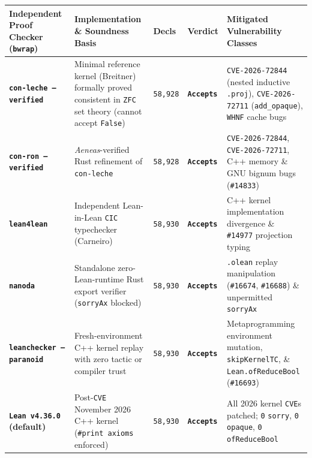 \documentclass[10pt,letterpaper]{article}
\newcounter{none}
\begin{document}
{\def\LTcaptype{none} %
{\footnotesize\setlength{\tabcolsep}{3.8pt}\renewcommand{\arraystretch}{1.15}
\begin{longtable}[]{@{}
  >{\raggedright\arraybackslash}p{}
  >{\raggedright\arraybackslash}p{}
  >{\centering\arraybackslash}p{}
  >{\centering\arraybackslash}p{}
  >{\raggedright\arraybackslash}p{}@{}}
\toprule\noalign{}
\textbf{Independent Proof Checker (\texttt{bwrap})} &
\textbf{Implementation \& Soundness Basis} &
\textbf{Decls} &
\textbf{Verdict} &
\textbf{Mitigated Vulnerability Classes} \\
\midrule\noalign{}
\endhead
\bottomrule\noalign{}
\endlastfoot
\textbf{\texttt{con-leche\ --verified}} & Minimal reference kernel
(Breitner) formally proved consistent in \texttt{ZFC} set theory (cannot
accept \texttt{False}) & \texttt{58,928} & \textbf{\texttt{Accepts}} &
\texttt{CVE-2026-72844} (nested inductive \texttt{.proj}),
\texttt{CVE-2026-72711} (\texttt{add\_opaque}), \texttt{WHNF} cache bugs \\
\textbf{\texttt{con-ron\ --verified}} & \emph{Aeneas}-verified Rust
refinement of \texttt{con-leche} & \texttt{58,928} &
\textbf{\texttt{Accepts}} & \texttt{CVE-2026-72844},
\texttt{CVE-2026-72711}, C++ memory \& GNU bignum bugs
(\texttt{\#14833}) \\
\textbf{\texttt{lean4lean}} & Independent Lean-in-Lean \texttt{CIC}
typechecker (Carneiro) & \texttt{58,930} & \textbf{\texttt{Accepts}} &
C++ kernel implementation divergence \& \texttt{\#14977} projection typing \\
\textbf{\texttt{nanoda}} & Standalone zero-Lean-runtime Rust export
verifier (\texttt{sorryAx} blocked) & \texttt{58,930} &
\textbf{\texttt{Accepts}} & \texttt{.olean} replay manipulation
(\texttt{\#16674}, \texttt{\#16688}) \& unpermitted \texttt{sorryAx} \\
\textbf{\texttt{leanchecker\ --paranoid}} & Fresh-environment C++ kernel
replay with zero tactic or compiler trust & \texttt{58,930} &
\textbf{\texttt{Accepts}} & Metaprogramming environment mutation,
\texttt{skipKernelTC}, \& \texttt{Lean.\allowbreak{}ofReduceBool} (\texttt{\#16693}) \\
\textbf{\texttt{Lean\ v4.36.0} (default)} & Post-\texttt{CVE} November
2026 C++ kernel (\texttt{\#print\ axioms} enforced) & \texttt{58,930} &
\textbf{\texttt{Accepts}} & All 2026 kernel \texttt{CVE}s patched;
\texttt{0} \texttt{sorry}, \texttt{0} \texttt{opaque}, \texttt{0} \texttt{ofReduceBool} \\
\end{longtable}
}
}
\end{document}
